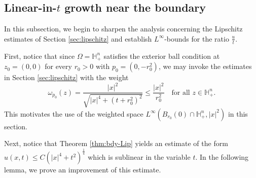 \documentclass[12pt]{amsart}
\def \H {{\mathbb H}}
\begin{document}
\subsection{Linear-in-$t$ growth near the boundary}\label{subsec-linear-growth}
In this subsection, we begin to sharpen the analysis concerning the Lipschitz estimates of Section \ref{sec:lipschitz} and establish $L^\infty$-bounds for the ratio $\frac{u}{t}$. 

First, notice that since $\Omega=\H^n_+$ satisfies the exterior ball condition at $z_0=(0,0)$ for every $r_0>0$ with $p_0=(0,-r_0^2)$, we may invoke the estimates in Section \ref{sec:lipschitz} with the weight
\[\omega_{p_0}(z)=\frac{|x|^2}{\sqrt{|x|^4+(t+r_0^2)^2}}\leq \frac{|x|^2}{r_0^2} \quad \text{for all } z\in \H^n_+.
\]
This motivates the use of the weighted space $L^{\infty}(B_{r_0}(0)\cap\H^n_+,|x|^2)$ in this section. 

Next, notice that Theorem \ref{thm:bdy-Lip} yields an estimate of the form $u(x,t)\leq C \left(|x|^4+t^2\right)^{\frac{1}{4}}$ which is sublinear in the variable $t$. In the following lemma, we prove an improvement of this estimate.
\end{document}
